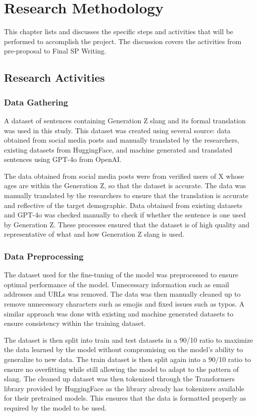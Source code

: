 \chapter{Research Methodology}
This chapter lists and discusses the specific steps and activities that will be performed to accomplish the project. 
The discussion covers the activities from pre-proposal to Final SP Writing.

\section{Research Activities}
\subsection{Data Gathering} 
A dataset of sentences containing Generation Z slang and its formal translation was used in this study. 
This dataset was created using several source: data obtained from social media posts and manually translated by the researchers, existing datasets from HuggingFace, and machine generated and translated sentences using GPT-4o from OpenAI.

The data obtained from social media posts were from verified users of X whose ages are within the Generation Z, so that the dataset is accurate. The data was manually translated by the researchers to ensure that the translation is accurate and reflective of the target demographic. Data obtained from existing datasets and GPT-4o was checked manually to check if whether the sentence is one used by Generation Z. These processes ensured that the dataset is of high quality and representative of what and how Generation Z slang is used.

\subsection{Data Preprocessing} 
The dataset used for the fine-tuning of the model was preprocessed to ensure optimal performance of the model.
Unnecessary information such as email addresses and URLs was removed. The data was then manually cleaned up to remove unnecessary characters such as emojis and fixed issues such as typos. A similar approach was done with existing and machine generated datasets to ensure consistency within the training dataset.

The dataset is then split into train and test datasets in a 90/10 ratio to maximize the data learned by the model without compromising on the model's ability to generalize to new data. The train dataset is then split again into a 90/10 ratio to ensure no overfitting while still allowing the model to adapt to the pattern of slang. The cleaned up dataset was then tokenized through the Transformers library provided by HuggingFace as the library already has tokenizers available for their pretrained models.
This ensures that the data is formatted properly as required by the model to be used.


